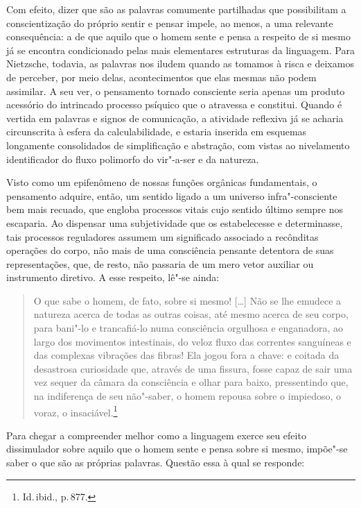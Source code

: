 Com efeito, dizer que são as palavras comumente partilhadas que
possibilitam a conscientização do próprio sentir e pensar impele,
ao menos, a uma relevante consequência: a de que aquilo que o homem
sente e pensa a respeito de si mesmo já se encontra
condicionado pelas mais elementares estruturas da linguagem. 
Para Nietzsche, todavia, as palavras nos iludem quando as
tomamos à risca e deixamos de perceber, por meio delas, acontecimentos
que elas mesmas não podem assimilar. A seu ver, o pensamento 
tornado consciente seria apenas um produto acessório do intrincado
processo psíquico que o atravessa e constitui. 
Quando é vertida em palavras e
signos de comunicação, a atividade reflexiva já se acharia circunscrita
à esfera da calculabilidade, e estaria inserida em esquemas longamente
consolidados de simplificação e abstração, com vistas ao nivelamento
identificador do fluxo polimorfo do vir"-a{}-ser e da natureza.

Visto como um epifenômeno de nossas funções orgânicas fundamentais, o
pensamento adquire, então, um sentido ligado a um universo
infra"-consciente bem mais recuado, que engloba processos vitais cujo
sentido último sempre nos escaparia. Ao dispensar uma subjetividade que
os estabelecesse e determinasse, tais processos reguladores assumem
um significado associado a recônditas operações do corpo, não mais de
uma consciência pensante detentora de suas representações, que, de
resto, não passaria de um mero vetor auxiliar ou instrumento diretivo.
A esse respeito, lê"-se ainda:

\begin{quote}
O que sabe o homem, de fato, sobre si mesmo! [\ldots{}] Não se lhe emudece
a natureza acerca de todas as outras coisas, até mesmo acerca de seu
corpo, para bani"-lo e trancafiá{}-lo numa consciência orgulhosa e
enganadora, ao largo dos movimentos intestinais, do veloz fluxo das
correntes sanguíneas e das complexas vibrações das fibras! Ela jogou
fora a chave: e coitada da desastrosa curiosidade que, através de uma
fissura, fosse capaz de sair uma vez sequer da câmara da consciência e
olhar para baixo, pressentindo que, na indiferença de seu não"-saber,
o homem repousa sobre o impiedoso, o voraz, o
insaciável.\footnote{ Id.\,ibid., p.\,877.}
\end{quote}

Para chegar a compreender melhor como a linguagem exerce seu efeito
dissimulador sobre aquilo que o homem sente e pensa sobre si mesmo,
impõe"-se saber o que são as próprias palavras. Questão essa à qual se
responde: 

